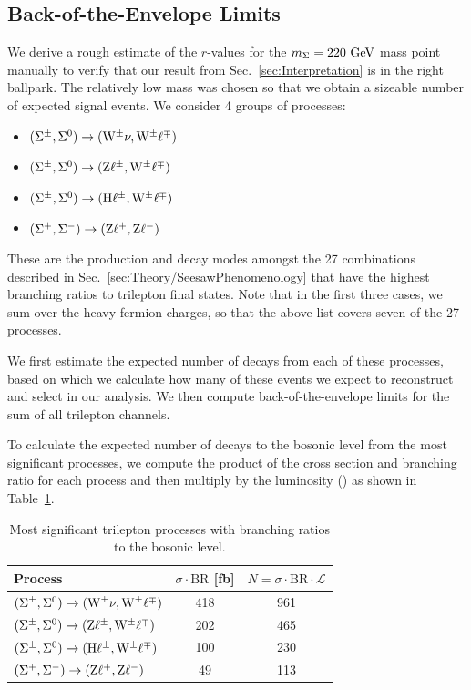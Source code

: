 \subsection{Back-of-the-Envelope Limits}
\label{sec:Results/BackOfEnvelope}
We derive a rough estimate of the $r$-values for the $m_\Sigma = 220\,\,\text{Ge\hspace{-.08em}V}$ mass point manually to verify that our result from Sec.~\ref{sec:Interpretation} is in the right ballpark. The relatively low mass was chosen so that we obtain a sizeable number of expected signal events. We consider 4 groups of processes:
\begin{itemize}
	\item $(\Sigma^\pm, \Sigma^0) \to (\mathrm{W}^\pm \nu, \mathrm{W}^\pm \ell^\mp)$
	\item $(\Sigma^\pm, \Sigma^0) \to (\mathrm{Z} \ell^\pm, \mathrm{W}^\pm \ell^\mp)$
	\item $(\Sigma^\pm, \Sigma^0) \to (\mathrm{H} \ell^\pm, \mathrm{W}^\pm \ell^\mp)$
	\item $(\Sigma^+, \Sigma^-) \to (\mathrm{Z} \ell^+, \mathrm{Z} \ell^-)$
\end{itemize}
These are the production and decay modes amongst the 27 combinations described in Sec.~\ref{sec:Theory/SeesawPhenomenology} that have the highest branching ratios to trilepton final states. Note that in the first three cases, we sum over the heavy fermion charges, so that the above list covers seven of the 27 processes.

We first estimate the expected number of decays from each of these processes, based on which we calculate how many of these events we expect to reconstruct and select in our analysis. We then compute back-of-the-envelope limits for the sum of all trilepton channels.

To calculate the expected number of decays to the bosonic level from the most significant processes, we compute the product of the cross section and branching ratio for each process and then multiply by the luminosity (\fullLumi) as shown in Table~\ref{tab:BackOfEnvelope/1}.

\begin{table}
\centering
\caption{Most significant trilepton processes with branching ratios to the bosonic level.} \label{tab:BackOfEnvelope/1}
\begin{tabular}{lcc}
\hline\hline
Process                                                       & $\sigma \cdot \textrm{BR}$ [fb] & $N = \sigma \cdot \textrm{BR} \cdot \mathcal{L}$ \\
\hline
$(\Sigma^\pm, \Sigma^0) \to (\mathrm{W}^\pm \nu, \mathrm{W}^\pm \ell^\mp)$  & 418                             & 961 \\
$(\Sigma^\pm, \Sigma^0) \to (\mathrm{Z} \ell^\pm, \mathrm{W}^\pm \ell^\mp)$  & 202                             & 465 \\
$(\Sigma^\pm, \Sigma^0) \to (\mathrm{H} \ell^\pm, \mathrm{W}^\pm \ell^\mp)$ & 100                             & 230 \\
$(\Sigma^+, \Sigma^-) \to (\mathrm{Z} \ell^+, \mathrm{Z} \ell^-)$             & 49                              & 113 \\
\end{tabular}
\end{table}


